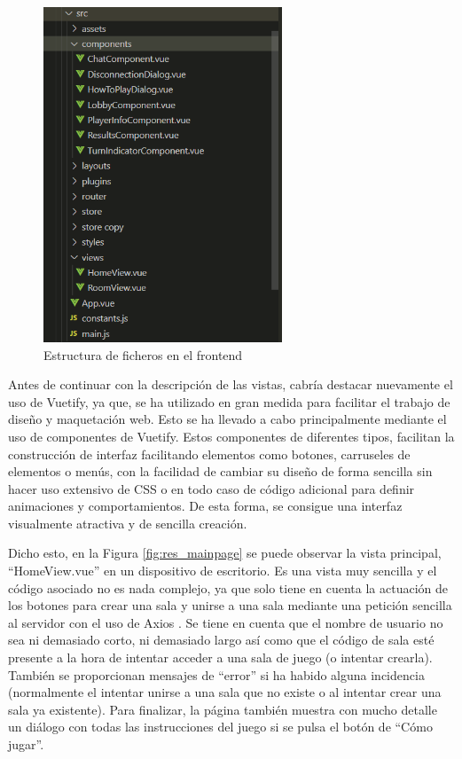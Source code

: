 \begin{figure}[h]
	\centering
	\includegraphics[height=10cm,clip=true]{res_estructFronted.png}
	\caption{Estructura de ficheros en el frontend}
	\label{fig:res_estructFronted}
\end{figure}

Antes de continuar con la descripción de las vistas, cabría destacar nuevamente el uso de Vuetify, ya que, se ha utilizado en gran medida para facilitar 
el trabajo de diseño y maquetación web. Esto se ha llevado a cabo principalmente mediante el uso de componentes de Vuetify. Estos componentes de diferentes tipos, facilitan la
construcción de interfaz facilitando elementos como botones, carruseles de elementos o menús, con la facilidad de cambiar su diseño de forma sencilla sin hacer uso
extensivo de CSS o en todo caso de código adicional para definir animaciones y comportamientos. De esta forma, se consigue una interfaz visualmente atractiva y de sencilla
creación.

Dicho esto, en la Figura \ref{fig:res_mainpage} se puede observar la vista principal, ``HomeView.vue'' en un dispositivo de escritorio. Es una vista muy sencilla y el código asociado no
es nada complejo, ya que solo tiene en cuenta la actuación de los botones para crear una sala y unirse a una sala mediante una petición sencilla al servidor con el uso de Axios \cite{vueAxios}. 
Se tiene en cuenta que el nombre de usuario no sea ni demasiado corto, ni demasiado largo así como que el código de sala esté presente a la hora de intentar acceder a una sala de juego 
(o intentar crearla). También se proporcionan mensajes de ``error'' si ha habido alguna incidencia (normalmente el intentar unirse a una sala que no existe o al intentar crear una sala ya existente). 
Para finalizar, la página también muestra con mucho detalle un diálogo con todas las instrucciones del juego si se pulsa el botón de ``Cómo jugar''.

